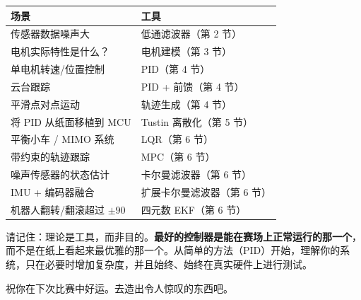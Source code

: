 \begin{center}
\begin{tabular}{ll}
\toprule
\textbf{场景} & \textbf{工具} \\
\midrule
传感器数据噪声大 & 低通滤波器（第 2 节） \\
电机实际特性是什么？ & 电机建模（第 3 节） \\
单电机转速/位置控制 & PID（第 4 节） \\
云台跟踪 & PID + 前馈（第 4 节） \\
平滑点对点运动 & 轨迹生成（第 4 节） \\
将 PID 从纸面移植到 MCU & Tustin 离散化（第 5 节） \\
平衡小车 / MIMO 系统 & LQR（第 6 节） \\
带约束的轨迹跟踪 & MPC（第 6 节） \\
噪声传感器的状态估计 & 卡尔曼滤波器（第 6 节） \\
IMU + 编码器融合 & 扩展卡尔曼滤波器（第 6 节） \\
机器人翻转/翻滚超过 $\pm 90$\textdegree{} & 四元数 EKF（第 6 节） \\
\bottomrule
\end{tabular}
\end{center}

请记住：理论是工具，而非目的。\textbf{最好的控制器是能在赛场上正常运行的那一个}，而不是在纸上看起来最优雅的那一个。从简单的方法（PID）开始，理解你的系统，只在必要时增加复杂度，并且始终、始终在真实硬件上进行测试。

祝你在下次比赛中好运。去造出令人惊叹的东西吧。


